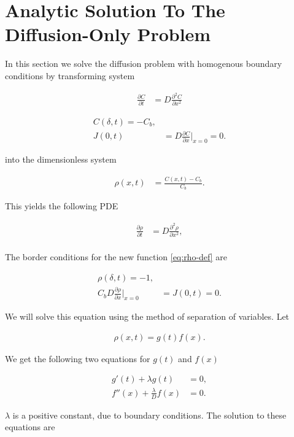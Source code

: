\section{Analytic Solution To The Diffusion-Only Problem}
\label{appendix:analytic-diff-only}
In this section we solve the diffusion problem with homogenous boundary conditions by transforming system

\begin{align}
\frac{\partial C}{\partial t} &= D \frac{\partial^2 C}{\partial x^2}
\end{align}

\begin{align}
	C(\delta, t) = -C_b, \\
	 J(0, t) &= D\frac{\partial C}{\partial x}\big|_{x=0} = 0.
\end{align}

into the dimensionless system

\begin{align}
	\rho(x,t) &= \frac{C(x,t) - C_b}{C_b}.
	\label{eq:rho-def}
\end{align}

This yields the following PDE

\begin{align}
\frac{\partial \rho}{\partial t} &= D \frac{\partial^2 \rho}{\partial x^2},\\
\label{eq:diffusion-1d}
\end{align}


The border conditions for the new function \ref{eq:rho-def} are

\begin{align}
	\rho(\delta, t) = -1, \\
	C_b D\frac{\partial \rho}{\partial x}\big|_{x=0} &= J(0, t) = 0.
\end{align}


We will solve this equation using the method of separation of variables. Let

\begin{align}
	\rho(x,t) = g(t)f(x).
\end{align}

We get the following two equations for $g(t)$ and $f(x)$


\begin{align}
	g'(t) + \lambda g(t) &= 0,\\
	f''(x) + \frac{\lambda}{D} f(x) &= 0.
\end{align}

$\lambda$ is a positive constant, due to boundary conditions. The solution to these equations are

